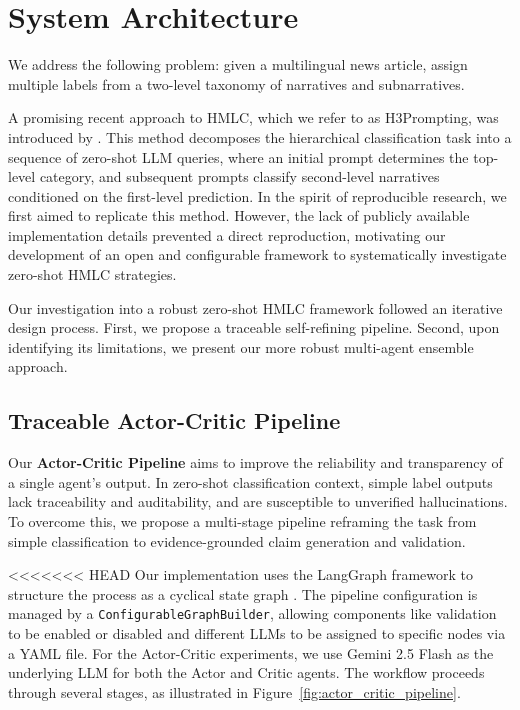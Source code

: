 \section{System Architecture}
We address the following problem: given a multilingual news article, assign multiple labels from a two-level taxonomy of narratives and subnarratives.

A promising recent approach to HMLC, which we refer to as H3Prompting, was introduced by \citet{singh-etal-2025-gatenlp}. 
This method decomposes the hierarchical classification task into a sequence of zero-shot LLM queries, where an initial prompt determines the top-level category, and subsequent prompts classify second-level narratives conditioned on the first-level prediction. 
In the spirit of reproducible research, we first aimed to replicate this method. 
However, the lack of publicly available implementation details prevented a direct reproduction, motivating our development of an open and configurable framework to systematically investigate zero-shot HMLC strategies.

Our investigation into a robust zero-shot HMLC framework followed an iterative design process. 
First, we propose a traceable self-refining pipeline. Second, upon identifying its limitations, we present our more robust multi-agent ensemble approach.




\subsection{Traceable Actor-Critic Pipeline}

Our \textbf{Actor-Critic Pipeline} aims to improve the reliability and transparency of a single agent's output. 
In zero-shot classification context, simple label outputs lack traceability and auditability, and are susceptible to unverified hallucinations. To overcome this, we propose a multi-stage pipeline reframing the task from simple classification to evidence-grounded claim generation and validation.

<<<<<<< HEAD
Our implementation uses the LangGraph framework to structure the process as a cyclical state graph \citep{langgraph2024}. The pipeline configuration is managed by a \texttt{ConfigurableGraphBuilder}, allowing components like validation to be enabled or disabled and different LLMs to be assigned to specific nodes via a YAML file. For the Actor-Critic experiments, we use Gemini 2.5 Flash as the underlying LLM for both the Actor and Critic agents. The workflow proceeds through several stages, as illustrated in Figure~\ref{fig:actor_critic_pipeline}.

